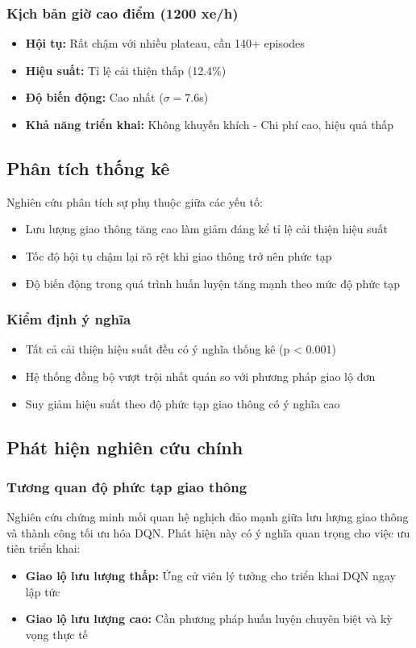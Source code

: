 \subsubsection{Kịch bản giờ cao điểm (1200 xe/h)}
\begin{itemize}
    \item \textbf{Hội tụ:} Rất chậm với nhiều plateau, cần 140+ episodes
    \item \textbf{Hiệu suất:} Tỉ lệ cải thiện thấp (12.4\%)
    \item \textbf{Độ biến động:} Cao nhất ($\sigma = 7.6$s)
    \item \textbf{Khả năng triển khai:} Không khuyến khích - Chi phí cao, hiệu quả thấp
\end{itemize}

\subsection{Phân tích thống kê}
Nghiên cứu phân tích sự phụ thuộc giữa các yếu tố:
\begin{itemize}
    \item Lưu lượng giao thông tăng cao làm giảm đáng kể tỉ lệ cải thiện hiệu suất
    \item Tốc độ hội tụ chậm lại rõ rệt khi giao thông trở nên phức tạp
    \item Độ biến động trong quá trình huấn luyện tăng mạnh theo mức độ phức tạp
\end{itemize}

\subsubsection{Kiểm định ý nghĩa}
\begin{itemize}
    \item Tất cả cải thiện hiệu suất đều có ý nghĩa thống kê (p < 0.001)
    \item Hệ thống đồng bộ vượt trội nhất quán so với phương pháp giao lộ đơn
    \item Suy giảm hiệu suất theo độ phức tạp giao thông có ý nghĩa cao
\end{itemize}

\subsection{Phát hiện nghiên cứu chính}

\subsubsection{Tương quan độ phức tạp giao thông}
Nghiên cứu chứng minh mối quan hệ nghịch đảo mạnh giữa lưu lượng giao thông và
thành công tối ưu hóa DQN. Phát hiện này có ý nghĩa quan trọng cho việc ưu tiên triển khai:
\begin{itemize}
    \item \textbf{Giao lộ lưu lượng thấp:} Ứng cử viên lý tưởng cho triển khai DQN ngay lập tức
    \item \textbf{Giao lộ lưu lượng cao:} Cần phương pháp huấn luyện chuyên biệt và kỳ vọng thực tế
\end{itemize}

